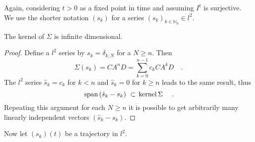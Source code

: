 Again, considering $t>0$ as a fixed point in time and assuming $I^t$ is surjective. We 
use the shorter notation $(s_k)$ for a series $(s_k)_{k\in\mathbb{N}_0}\in l^2$.
\begin{theorem}
	The kernel of $\Sigma$ is infinite dimensional.
\end{theorem}
\begin{proof}
	Define a $l^2$ series by $s_k=\delta_{k,N}$ for a $N\geq n$. Then
	\begin{equation}
	\Sigma (s_k) = CA^nD = \sum\limits_{k=0}^{n-1} c_kCA^kD \quad .
	\end{equation}
	The $l^2$ series $\hat{s}_k = c_k$ for $k < n$ and $\hat{s}_k = 0$ for $k\geq n$ 
	leads to the same result, thus 
	\begin{equation}
	 \, \text{span}\,(\hat{s}_k-s_k) \,\, \subset  \, \text{kernel}\,\Sigma \,\, \quad .
	\end{equation}
	Repeating this argument for each $N\geq n$ it is possible to get arbitrarily many 
	linearly independent vectors $(\hat{s}_k-s_k)$.
\end{proof}

Now let $(s_k)(t)$ be a trajectory in $l^2$. 
